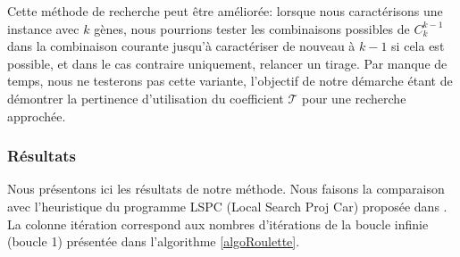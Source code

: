 \begin{remarque}
Cette méthode de recherche peut être améliorée: lorsque nous caractérisons une instance avec $k$ gènes, nous pourrions tester les combinaisons possibles de $C_k^{k-1}$ dans la combinaison courante jusqu'à caractériser de nouveau à $k-1$ si cela est possible, et dans le cas contraire uniquement, relancer un tirage. Par manque de temps, nous ne testerons pas cette variante, l'objectif de notre démarche étant de démontrer la pertinence d'utilisation du coefficient $\mathcal{T}$ pour une recherche approchée.
\end{remarque}

\subsubsection{Résultats}
Nous présentons ici les résultats de notre méthode. Nous faisons la comparaison avec l'heuristique du programme LSPC (Local Search Proj Car) proposée dans \cite{Chhel2013}. La colonne itération correspond aux nombres d'itérations de la boucle infinie (boucle 1) présentée dans l'algorithme \ref{algoRoulette}.
